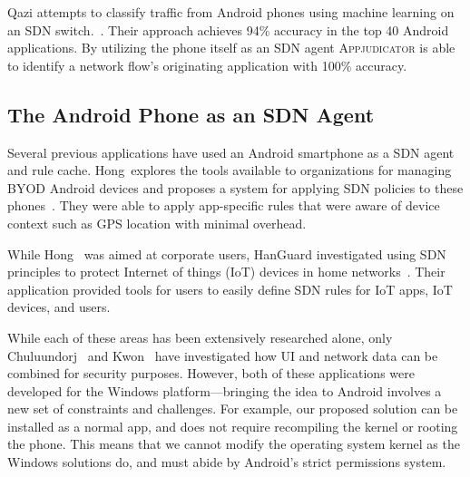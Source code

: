 Qazi \etal attempts to classify traffic from Android phones using machine
learning on an SDN switch.~\cite{qazi2013}. Their approach achieves 94\%
accuracy in the top 40 Android applications. By utilizing the phone itself as
an SDN agent \textsc{Appjudicator} is able to identify a network flow's
originating application with 100\% accuracy.

\subsection{The Android Phone as an SDN Agent}
\label{sec:the-android-phone-as-an-sdn-agent}

Several previous applications have used an Android smartphone as a SDN agent and
rule cache. Hong~\etal explores the tools available to organizations for
managing BYOD Android devices and proposes a system for applying SDN policies to
these phones~\cite{hong2016}. They were able to apply app-specific rules that
were aware of device context such as GPS location with minimal overhead.

While Hong~\etal \cite{hong2016} was aimed at corporate users, HanGuard
investigated using SDN principles to protect Internet of things (IoT) devices in
home networks~\cite{demetriou2017}. Their application provided tools for users
to easily define SDN rules for IoT apps, IoT devices, and users.

While each of these areas has been extensively researched alone, only
Chuluundorj~\cite{chuluundorj2019} and Kwon~\etal \cite{kwon2011} have
investigated how UI and network data can be combined for security purposes.
However, both of these applications were developed for the Windows
platform---bringing the idea to Android involves a new set of constraints and
challenges. For example, our proposed solution can be installed as a normal app,
and does not require recompiling the kernel or rooting the phone. This means
that we cannot modify the operating system kernel as the Windows solutions do,
and must abide by Android's strict permissions system.

\newpage
